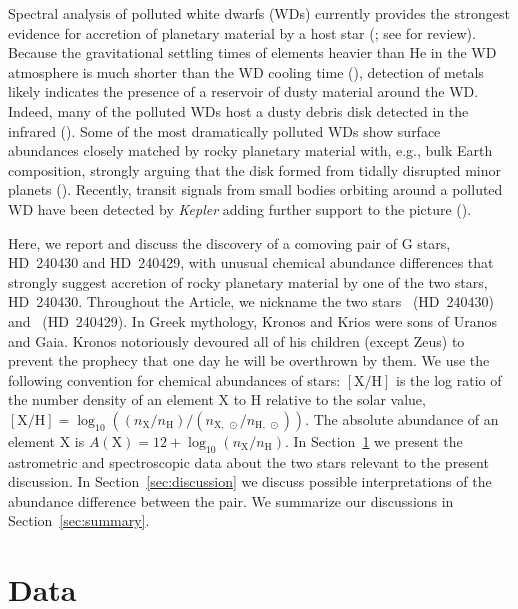 \documentclass[modern, letterpaper]{aastex61}
\newcommand{\project}[1]{\textsl{#1}}
\newcommand{\documentname}{Article}
\newcommand{\sectionname}{Section}
\newcommand*\elem[1]{\ensuremath{\mathrm{#1}}}
\newcommand*\elemH[1]{\ensuremath{[\mathrm{#1}/\elem{H}]}}
\newcommand{\sunanalog}{\text{Krios}}
\newcommand{\bizarreone}{\text{Kronos}}
\begin{document}
Spectral analysis of polluted white dwarfs (WDs) currently provides the
strongest evidence for accretion of planetary material by a host star
(\citealt{2003ApJ...596..477Z,2010ApJ...722..725Z,2014A&A...566A..34K};
see \citealt{2016NewAR..71....9F} for review).
Because the gravitational settling times of elements heavier than \elem{He} in
the WD atmosphere is much shorter than the WD cooling time
(\citealt{1986ApJS...61..197P}), detection of metals likely indicates the
presence of a reservoir of dusty material around the WD.
Indeed, many of the polluted WDs host a dusty debris disk detected in the
infrared (\citealt{1987Natur.330..138Z,1990ApJ...357..216G,2005ApJ...635L.161R,
  2009ApJ...694..805F,2006ApJ...646..474K}).
Some of the most dramatically polluted WDs show
surface abundances closely matched by rocky planetary material
with, e.g., bulk Earth composition, strongly arguing
that the disk formed from tidally disrupted minor planets
(\citealt{Zuckerman:2007aa,Klein:2010aa}).
Recently, transit signals from small bodies orbiting around a polluted WD
have been detected by \project{Kepler} adding further support to the picture
(\citealt{2015Natur.526..546V}).

Here, we report and discuss the discovery of a comoving pair of G stars,
HD~240430 and HD~240429, with unusual chemical abundance differences that
strongly suggest accretion of rocky planetary material by one of the two stars,
HD~240430.
Throughout the \documentname, we nickname the two stars \bizarreone\
(HD~240430) and \sunanalog\ (HD~240429).
In Greek mythology, Kronos and Krios were sons of Uranos and Gaia.
Kronos notoriously devoured all of his children (except Zeus)
to prevent the prophecy that one day he will be overthrown by them.
We use the following convention for chemical abundances of stars:
\elemH{X} is the log ratio of the number density of an element \elem{X} to \elem{H}
relative to the solar value,
$\elemH{X} = \log_{10} ((n_\elem{X}/n_\elem{H})/(n_{\elem{X},~\odot}/n_{\elem{H},~\odot}))$.
The absolute abundance of an element \elem{X} is $A(\elem{X}) = 12 + \log_{10}
(n_\elem{X}/n_\elem{H})$.
In \sectionname~\ref{sec:data} we present the astrometric and spectroscopic data
about the two stars relevant to the present discussion.
In \sectionname~\ref{sec:discussion} we discuss possible interpretations of the
abundance difference between the pair.
We summarize our discussions in \sectionname~\ref{sec:summary}.


\section{Data}
\label{sec:data}
\end{document}

